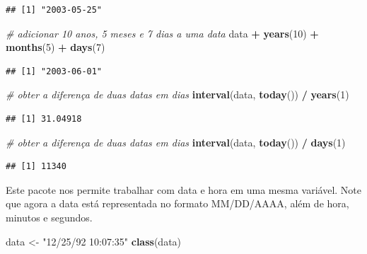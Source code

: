 \documentclass[
]{book}
\newenvironment{Shaded}{\begin{snugshade}}{\end{snugshade}}
\newcommand{\CommentTok}[1]{\textcolor[rgb]{0.56,0.35,0.01}{\textit{#1}}}
\newcommand{\DecValTok}[1]{\textcolor[rgb]{0.00,0.00,0.81}{#1}}
\newcommand{\FunctionTok}[1]{\textcolor[rgb]{0.13,0.29,0.53}{\textbf{#1}}}
\newcommand{\NormalTok}[1]{#1}
\newcommand{\OtherTok}[1]{\textcolor[rgb]{0.56,0.35,0.01}{#1}}
\newcommand{\SpecialCharTok}[1]{\textcolor[rgb]{0.81,0.36,0.00}{\textbf{#1}}}
\newcommand{\StringTok}[1]{\textcolor[rgb]{0.31,0.60,0.02}{#1}}
\begin{document}
\begin{verbatim}
## [1] "2003-05-25"
\end{verbatim}

\begin{Shaded}
\begin{Highlighting}[]
\CommentTok{\# adicionar 10 anos, 5 meses e 7 dias a uma data}
\NormalTok{data }\SpecialCharTok{+} \FunctionTok{years}\NormalTok{(}\DecValTok{10}\NormalTok{) }\SpecialCharTok{+} \FunctionTok{months}\NormalTok{(}\DecValTok{5}\NormalTok{) }\SpecialCharTok{+} \FunctionTok{days}\NormalTok{(}\DecValTok{7}\NormalTok{)}
\end{Highlighting}
\end{Shaded}

\begin{verbatim}
## [1] "2003-06-01"
\end{verbatim}

\begin{Shaded}
\begin{Highlighting}[]
\CommentTok{\# obter a diferença de duas datas em dias}
\FunctionTok{interval}\NormalTok{(data, }\FunctionTok{today}\NormalTok{()) }\SpecialCharTok{/} \FunctionTok{years}\NormalTok{(}\DecValTok{1}\NormalTok{)}
\end{Highlighting}
\end{Shaded}

\begin{verbatim}
## [1] 31.04918
\end{verbatim}

\begin{Shaded}
\begin{Highlighting}[]
\CommentTok{\# obter a diferença de duas datas em dias}
\FunctionTok{interval}\NormalTok{(data, }\FunctionTok{today}\NormalTok{()) }\SpecialCharTok{/} \FunctionTok{days}\NormalTok{(}\DecValTok{1}\NormalTok{)}
\end{Highlighting}
\end{Shaded}

\begin{verbatim}
## [1] 11340
\end{verbatim}

Este pacote nos permite trabalhar com data e hora em uma mesma variável.
Note que agora a data está representada no formato MM/DD/AAAA, além de hora, minutos e segundos.

\begin{Shaded}
\begin{Highlighting}[]
\NormalTok{data }\OtherTok{\textless{}{-}} \StringTok{"12/25/92 10:07:35"}
\FunctionTok{class}\NormalTok{(data)}
\end{Highlighting}
\end{Shaded}
\end{document}
